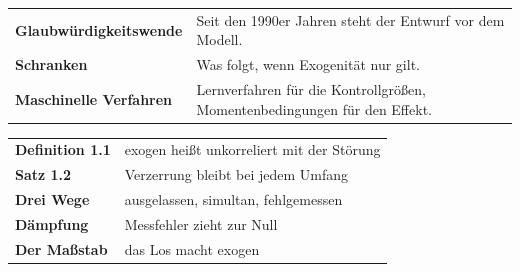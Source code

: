\begin{forschung}
\begin{center}
{\small
\renewcommand{\arraystretch}{1.45}
\begin{tabular}{@{}P{3.4cm}P{4.8cm}@{}}
\toprule
\textbf{Glaubwürdig\-keitswende} & Seit den 1990er Jahren steht der Entwurf vor dem Modell.\\
\textbf{Schranken} & Was folgt, wenn Exogenität nur  gilt.\\
\textbf{Maschinelle Verfahren} & Lernverfahren für die Kontrollgrößen, Momentenbedingungen für den Effekt.\\
\bottomrule
\end{tabular}}
\end{center}

\begin{center}
\begin{minipage}{0.88\textwidth}
\end{minipage}
\end{center}
\end{forschung}

\begin{merksatz}
\begin{center}
\renewcommand{\arraystretch}{1.5}
\begin{tabular}{@{}P{3.0cm}P{5.6cm}@{}}
\toprule
\textbf{Definition 1.1} & exogen heißt unkorreliert mit der Störung\\
\textbf{Satz 1.2} & Verzerrung bleibt bei jedem Umfang\\
\textbf{Drei Wege} & ausgelassen, simultan, fehlgemessen\\
\textbf{Dämpfung} & Messfehler zieht zur Null\\
\textbf{Der Maßstab} & das Los macht exogen\\
\bottomrule
\end{tabular}
\end{center}

\begin{center}
\begin{minipage}{0.88\textwidth}
\end{minipage}
\end{center}
\end{merksatz}
